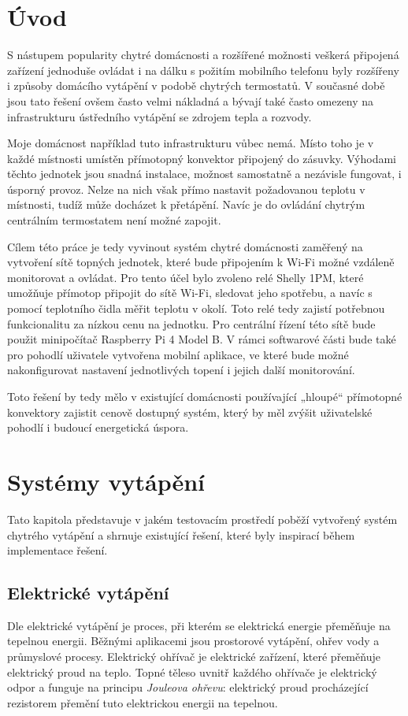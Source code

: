 \chapter{Úvod}

S nástupem popularity chytré domácnosti a rozšířené možnosti veškerá připojená zařízení jednoduše ovládat i na dálku s požitím mobilního telefonu byly rozšířeny i způsoby domácího vytápění v podobě chytrých termostatů. V současné době jsou tato řešení ovšem často velmi nákladná a bývají také často omezeny na infrastrukturu ústředního vytápění se zdrojem tepla a rozvody.

Moje domácnost například tuto infrastrukturu vůbec nemá. Místo toho je v každé místnosti umístěn přímotopný konvektor připojený do zásuvky. Výhodami těchto jednotek jsou snadná instalace, možnost samostatně a nezávisle fungovat, i úsporný provoz. Nelze na nich však přímo nastavit požadovanou teplotu v místnosti, tudíž může docházet k přetápění. Navíc je do ovládání chytrým centrálním termostatem není možné zapojit.

Cílem této práce je tedy vyvinout systém chytré domácnosti zaměřený na vytvoření sítě topných jednotek, které bude připojením k Wi-Fi možné vzdáleně monitorovat a ovládat. Pro tento účel bylo zvoleno relé Shelly 1PM, které umožňuje přímotop připojit do sítě Wi-Fi, sledovat jeho spotřebu, a navíc s pomocí teplotního čidla měřit teplotu v okolí. Toto relé tedy zajistí potřebnou funkcionalitu za nízkou cenu na jednotku. Pro centrální řízení této sítě bude použit minipočítač Raspberry Pi 4 Model B. V rámci softwarové části bude také pro pohodlí uživatele vytvořena mobilní aplikace, ve které bude možné nakonfigurovat nastavení jednotlivých topení i jejich další monitorování.

Toto řešení by tedy mělo v existující domácnosti používající „hloupé“ přímotopné konvektory zajistit cenově dostupný systém, který by měl zvýšit uživatelské pohodlí i budoucí energetická úspora.

\chapter{Systémy vytápění}
\label{teorie}
Tato kapitola představuje v jakém testovacím prostředí poběží vytvořený systém chytrého vytápění a shrnuje existující řešení, které byly inspirací během implementace řešení.

\section{Elektrické vytápění}
Dle \cite{electricHeating} elektrické vytápění je proces, při kterém se elektrická energie přeměňuje na tepelnou energii. Běžnými aplikacemi jsou prostorové vytápění, ohřev vody a průmyslové procesy. Elektrický ohřívač je elektrické zařízení, které přeměňuje elektrický proud na teplo. Topné těleso uvnitř každého ohřívače je elektrický odpor a funguje na principu {\it Jouleova ohřevu}: elektrický proud procházející rezistorem přemění tuto elektrickou energii na tepelnou.

